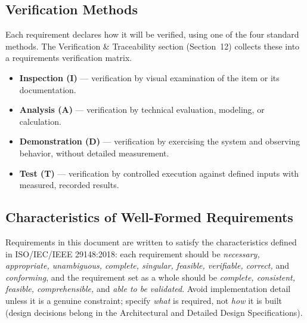 \subsection{Verification Methods}
Each requirement declares how it will be verified, using one of the four standard methods. The Verification \& Traceability section (Section~12) collects these into a requirements verification matrix.
\begin{itemize}
\item \textbf{Inspection (I)} --- verification by visual examination of the item or its documentation.
\item \textbf{Analysis (A)} --- verification by technical evaluation, modeling, or calculation.
\item \textbf{Demonstration (D)} --- verification by exercising the system and observing behavior, without detailed measurement.
\item \textbf{Test (T)} --- verification by controlled execution against defined inputs with measured, recorded results.
\end{itemize}

\subsection{Characteristics of Well-Formed Requirements}
Requirements in this document are written to satisfy the characteristics defined in ISO/IEC/IEEE 29148:2018: each requirement should be \textit{necessary, appropriate, unambiguous, complete, singular, feasible, verifiable, correct,} and \textit{conforming}, and the requirement set as a whole should be \textit{complete, consistent, feasible, comprehensible,} and \textit{able to be validated}. Avoid implementation detail unless it is a genuine constraint; specify \textit{what} is required, not \textit{how} it is built (design decisions belong in the Architectural and Detailed Design Specifications).
